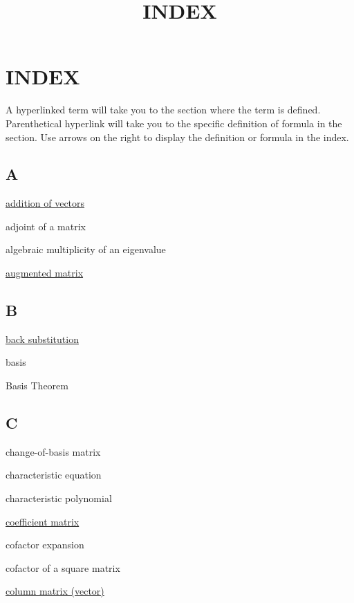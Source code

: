 \documentclass{ximera}
\title{INDEX} \license{CC BY-NC-SA 4.0}
\begin{document}
\begin{abstract}
\end{abstract}
\maketitle



\section{INDEX}
A hyperlinked term will take you to the section where the term is defined.  Parenthetical hyperlink will take you to the specific definition of formula in the section.  Use arrows on the right to display the definition or formula in the index.
\subsection{A}
\href{https://ximera.osu.edu/oerlinalg/LinearAlgebra/VEC-0030/main}{addition of vectors}

adjoint of a matrix

algebraic multiplicity of an eigenvalue

\href{https://ximera.osu.edu/oerlinalg/LinearAlgebra/SYS-0020/main}{augmented matrix}


\subsection{B}

\href{https://ximera.osu.edu/oerlinalg/LinearAlgebra/SYS-0020/main}{back substitution}

basis

Basis Theorem

\subsection{C}

change-of-basis matrix

characteristic equation

characteristic polynomial

\href{https://ximera.osu.edu/oerlinalg/LinearAlgebra/SYS-0020/main}{coefficient matrix}

cofactor expansion

cofactor of a square matrix %

\href{https://ximera.osu.edu/oerlinalg/LinearAlgebra/MAT-0010/main}{column matrix (vector)}
\end{document}
